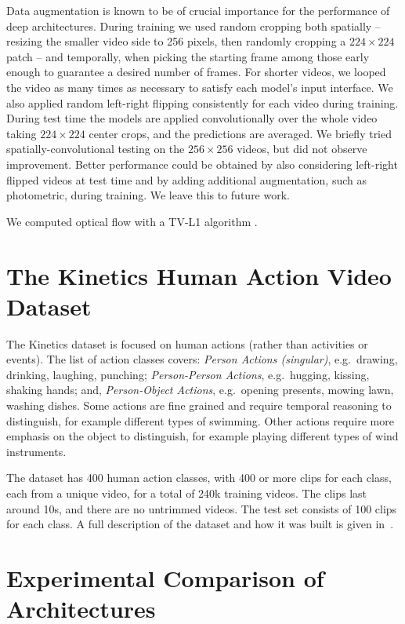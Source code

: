 \documentclass[10pt,twocolumn,letterpaper]{article}
\begin{document}
Data augmentation is known to be of crucial importance for the
performance of deep architectures. During training we used random
cropping both spatially -- resizing the smaller video side to 256
pixels, then randomly cropping a $224 \times 224$ patch -- and
temporally, when picking the starting frame among those early enough
to guarantee a desired number of frames. For shorter videos, we looped the video as many times as necessary to satisfy each model's input interface. We also applied random left-right flipping consistently for each video during
training. During test time the models are applied convolutionally over the whole video taking $224 \times 224$ center crops, and the predictions are averaged. We briefly tried spatially-convolutional testing on the $256 \times 256$ videos, but did not observe improvement. Better performance could be obtained by also considering left-right flipped videos at test time and by adding additional augmentation, such as photometric, during training. We leave this to future work.

We computed optical flow with a TV-L1 algorithm \cite{zach2007duality}.
 
\section{The Kinetics Human Action Video Dataset\label{dataset}}

The Kinetics dataset is focused on human actions (rather than activities or
events). The list of action classes covers: {\em Person Actions
(singular)}, e.g.\ drawing, drinking, laughing, punching; {\em
Person-Person Actions}, e.g.\ hugging, kissing, shaking hands; and,
{\em Person-Object Actions}, e.g.\ opening presents, mowing lawn, washing dishes.  Some actions are fine grained and require temporal reasoning
to distinguish, for example different types of swimming. Other actions
require more emphasis on the object to distinguish, for example
playing different types of wind instruments.  

The dataset has 400 human action classes, with 400 or more clips for
each class, each from a unique video, for a total of 240k training videos. The clips last around 10s, and
there are no untrimmed videos.  The test set consists of 100 clips for
each class.  A full description of the dataset and how it was built is
given in~\cite{kinetics_arxiv}.


\section{Experimental Comparison of Architectures \label{comp_arch}}
\end{document}
